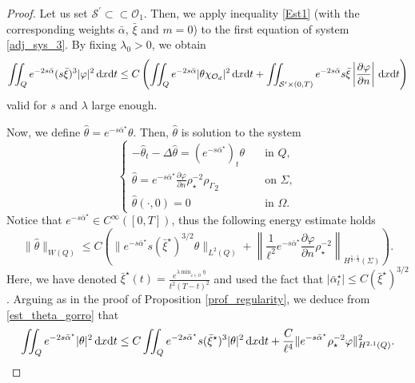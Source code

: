 \documentclass{aims}
\theoremstyle{definition}
\def\csbd{\rho_{\Gamma}}
\def\dx{\,\textnormal{d}x}
\def\dt{\textnormal{d}t}
\begin{document}
\begin{proof}
Let us set $\mathcal S^\prime\subset\subset \mathcal O_1$. Then, we apply inequality \eqref{Est1} (with the corresponding weights $\bar\alpha$, $\bar\xi$ and $m=0$) to the first equation of system \eqref{adj_sys_3}. By fixing $\lambda_0>0$, we obtain
%
\begin{equation}\label{car_init_sec3}
\iint_Qe^{-2s\bar\alpha}(s\bar\xi)^3|\varphi|^2\dx\dt\leq C\left(\iint_{Q}e^{-2s\bar\alpha}|\theta\chi_{\mathcal O_d}|^2\dx\dt+\iint_{\mathcal S^\prime\times(0,T)}e^{-2s\bar\alpha}s\bar\xi\left|\frac{\partial \varphi}{\partial n}\right|\dx\dt\right)
\end{equation}
%
valid for $s$ and $\lambda$ large enough. 

Now, we define $\widehat{\theta}=e^{-s\bar\alpha^\star}\theta$. Then, $\widehat{\theta}$ is solution to the system 
%
\begin{equation*}%
\begin{cases}
-\widehat\theta_t-\Delta \widehat\theta=(e^{-s\bar\alpha^\star})_t\theta &\quad \text{in } Q, \\
\widehat\theta=e^{-s\bar\alpha^\star}\frac{\partial\varphi}{\partial n}\rho_\star^{-2}{\csbd}_{2} &\quad \text{on } \Sigma, \\
\widehat{\theta}(\cdot,0)=0 &\quad\text{in } \Omega.
\end{cases}
\end{equation*}
%
Notice that $e^{-s\bar\alpha^\star}\in C^{\infty}([0,T])$, thus the following energy estimate holds
%
\begin{equation}\label{est_theta_gorro}
\|\widehat\theta\|_{W(Q)}\leq C\left(\|e^{-s\bar\alpha^\star}s(\bar\xi^\star)^{3/2}\theta\|_{L^2(Q)}+\left\|\frac{1}{\ell^2}e^{-s\bar\alpha^\star}\frac{\partial\varphi}{\partial n}\rho_\star^{-2}\right\|_{H^{\frac12,\frac14}(\Sigma)}\right).
\end{equation}
%
Here, we have denoted $\bar{\xi}^\star(t)=\frac{e^{\lambda\min_{x\in \overline\Omega}\bar\eta}}{t^2(T-t)^2}$ and used the fact that $|\bar\alpha^\star_t|\leq C({\bar\xi}^\star)^{3/2}$ . Arguing as in the proof of Proposition \ref{prof_regularity}, we deduce from \eqref{est_theta_gorro} that
%
\begin{equation}\label{est_bar_theta}
\iint_{Q}e^{-2s\bar\alpha^\star}|\theta|^2\dx\dt \leq C\iint_{Q}e^{-2s\bar\alpha^\star}s(\bar\xi^\star)^3|\theta|^2\dx\dt+\frac{C}{\ell^4}\|e^{-s\bar\alpha^\star}\rho_\star^{-2}\varphi\|^2_{H^{2,1}(Q)}.
\end{equation}
%


\end{proof}
\end{document}
